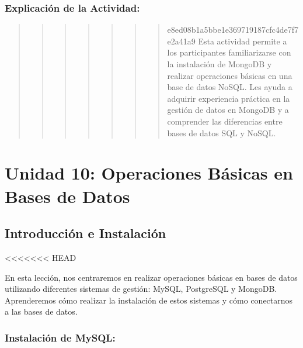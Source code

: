 \documentclass[
  a4paper,
  DIV=11,
  numbers=noendperiod,
  onepage,
  openany]{scrreprt}
\begin{document}
\hypertarget{explicaciuxf3n-de-la-actividad-69}{%
\section{Explicación de la
Actividad:}\label{explicaciuxf3n-de-la-actividad-69}}

\begin{quote}
\begin{quote}
\begin{quote}
\begin{quote}
\begin{quote}
\begin{quote}
\begin{quote}
e8ed08b1a5bbe1e369719187cfc4de7f7e2a41a9 Esta actividad permite a los
participantes familiarizarse con la instalación de MongoDB y realizar
operaciones básicas en una base de datos NoSQL. Les ayuda a adquirir
experiencia práctica en la gestión de datos en MongoDB y a comprender
las diferencias entre bases de datos SQL y NoSQL.
\end{quote}
\end{quote}
\end{quote}
\end{quote}
\end{quote}
\end{quote}
\end{quote}

\part{Unidad 10: Operaciones Básicas en Bases de Datos}

\hypertarget{introducciuxf3n-e-instalaciuxf3n}{%
\chapter{Introducción e
Instalación}\label{introducciuxf3n-e-instalaciuxf3n}}

\textless\textless\textless\textless\textless\textless\textless{} HEAD

En esta lección, nos centraremos en realizar operaciones básicas en
bases de datos utilizando diferentes sistemas de gestión: MySQL,
PostgreSQL y MongoDB. Aprenderemos cómo realizar la instalación de estos
sistemas y cómo conectarnos a las bases de datos.

\hypertarget{instalaciuxf3n-de-mysql}{%
\section{Instalación de MySQL:}\label{instalaciuxf3n-de-mysql}}
\end{document}
